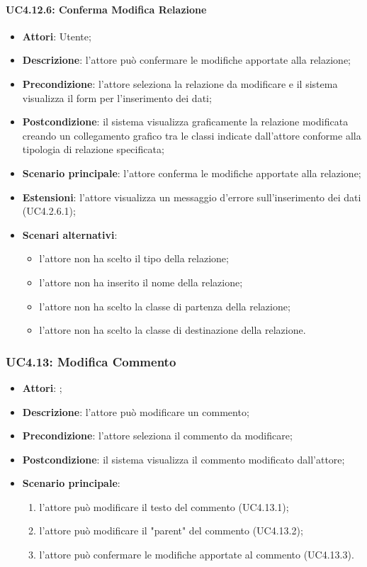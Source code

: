 \paragraph{UC4.12.6: Conferma Modifica Relazione}
\label{UC4.12.6}
\begin{itemize}
\item \textbf{Attori}: Utente;
\item \textbf{Descrizione}: l'attore può confermare le modifiche apportate alla relazione;	
\item \textbf{Precondizione}: l'attore seleziona la relazione da modificare e il sistema visualizza il form per l'inserimento dei dati;	
\item \textbf{Postcondizione}:  il sistema visualizza graficamente la relazione modificata creando un collegamento grafico tra le classi indicate dall'attore conforme alla tipologia di relazione specificata;
\item \textbf{Scenario principale}:
l'attore conferma le modifiche apportate alla relazione;	
\item \textbf{Estensioni}:
l'attore visualizza un messaggio d'errore sull'inserimento dei dati (UC4.2.6.1);
\item \textbf{Scenari alternativi}:
\begin{itemize}
	\item l'attore non ha scelto il tipo della relazione;
	\item l'attore non ha inserito il nome della relazione;
	\item l'attore non ha scelto la classe di partenza della relazione;
	\item l'attore non ha scelto la classe di destinazione della relazione.
\end{itemize}
\end{itemize}

\subsubsection{UC4.13: Modifica Commento}
\label{UC4.13}
\begin{itemize}
\item \textbf{Attori}: ;
\item \textbf{Descrizione}: l'attore può modificare un commento;	
\item \textbf{Precondizione}: l'attore seleziona il commento da modificare;	
\item \textbf{Postcondizione}: il sistema visualizza il commento modificato dall'attore;	
\item \textbf{Scenario principale}:
\begin{enumerate}
\item l'attore può modificare il testo del commento (UC4.13.1);
\item l'attore può modificare il "parent" del commento (UC4.13.2);
\item l'attore può confermare le modifiche apportate al commento (UC4.13.3).
\end{enumerate}
\end{itemize}

